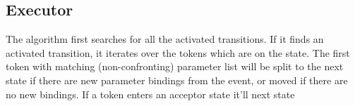 		\subsection{Executor}
			The algorithm first searches for all the activated transitions.
			If it finds an activated transition, it iterates over the tokens which are on the state. The first token with matching (non-confronting)
			parameter list will be split to the next state if there are new parameter bindings from the event, or moved if there are no new bindings.
			If a token enters an acceptor state it'll 
			next state 
